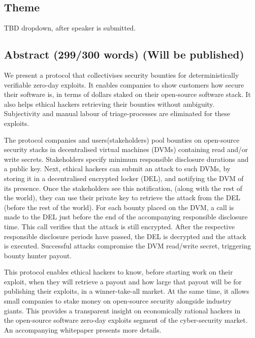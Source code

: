 \documentclass{article}
\begin{document}
\subsection*{Theme}
TBD dropdown, after speaker is submitted.
\subsection{Abstract (299/300 words) (Will be published)}
We present a protocol that collectivises security bounties for deterministically verifiable zero-day exploits. It enables companies to show customers how secure their software is, in terms of dollars staked on their open-source software stack. It also helps ethical hackers retrieving their bounties without ambiguity. Subjectivity and manual labour of triage-processes are eliminated for these exploits.

The protocol companies and users(stakeholders) pool bounties on open-source security stacks in decentralised virtual machines (DVMs) containing read and/or write secrets. Stakeholders specify minimum responsible disclosure durations and a public key. Next, ethical hackers can submit an attack to such DVMs, by storing it in a decentralised encrypted locker (DEL), and notifying the DVM of its presence. Once the stakeholders see this notification, (along with the rest of the world), they can use their private key to retrieve the attack from the DEL (before the rest of the world). For each bounty placed on the DVM, a call is made to the DEL just before the end of the accompanying responsible disclosure time. This call verifies that the attack is still encrypted. After the respective responsible disclosure periods have passed, the DEL is decrypted and the attack is executed. Successful attacks compromise the DVM read/write secret, triggering bounty hunter payout.

This protocol enables ethical hackers to know, before starting work on their exploit, when they will retrieve a payout and how large that payout will be for publishing their exploits, in a winner-take-all market. At the same time, it allows small companies to stake money on open-source security alongside industry giants. This provides a transparent insight on economically rational hackers in the open-source software zero-day exploits segment of the cyber-security market. An accompanying whitepaper presents more details.

\end{document}
